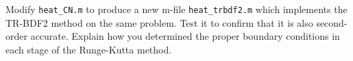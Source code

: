 Modify \texttt{heat\_CN.m} to produce a new m-file \texttt{heat\_trbdf2.m} which implements the TR-BDF2 method on the
same problem. Test it to confirm that it is also second-order accurate. Explain how you determined the proper boundary
conditions in each stage of the Runge-Kutta method.

\begin{solution}\ \\\\
    \hfill\vfill
    \ \\
\end{solution}